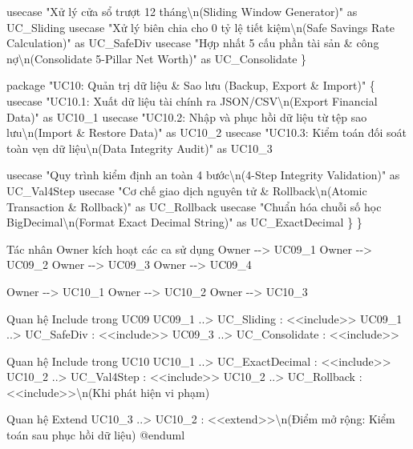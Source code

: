 \documentclass[11pt,a4paper]{article}
\newenvironment{Shaded}{}{}
\newcommand{\NormalTok}[1]{#1}
\begin{document}
\begin{Shaded}
\begin{Highlighting}[]
\NormalTok{        usecase "Xử lý cửa sổ trượt 12 tháng\textbackslash{}n(Sliding Window Generator)" as UC\_Sliding}
\NormalTok{        usecase "Xử lý biên chia cho 0 tỷ lệ tiết kiệm\textbackslash{}n(Safe Savings Rate Calculation)" as UC\_SafeDiv}
\NormalTok{        usecase "Hợp nhất 5 cấu phần tài sản \& công nợ\textbackslash{}n(Consolidate 5{-}Pillar Net Worth)" as UC\_Consolidate}
\NormalTok{    \}}

\NormalTok{    package "UC10: Quản trị dữ liệu \& Sao lưu (Backup, Export \& Import)" \{}
\NormalTok{        usecase "UC10.1: Xuất dữ liệu tài chính ra JSON/CSV\textbackslash{}n(Export Financial Data)" as UC10\_1}
\NormalTok{        usecase "UC10.2: Nhập và phục hồi dữ liệu từ tệp sao lưu\textbackslash{}n(Import \& Restore Data)" as UC10\_2}
\NormalTok{        usecase "UC10.3: Kiểm toán đối soát toàn vẹn dữ liệu\textbackslash{}n(Data Integrity Audit)" as UC10\_3}
        
\NormalTok{        usecase "Quy trình kiểm định an toàn 4 bước\textbackslash{}n(4{-}Step Integrity Validation)" as UC\_Val4Step}
\NormalTok{        usecase "Cơ chế giao dịch nguyên tử \& Rollback\textbackslash{}n(Atomic Transaction \& Rollback)" as UC\_Rollback}
\NormalTok{        usecase "Chuẩn hóa chuỗi số học BigDecimal\textbackslash{}n(Format Exact Decimal String)" as UC\_ExactDecimal}
\NormalTok{    \}}
\NormalTok{\}}

\NormalTok{\textquotesingle{} Tác nhân Owner kích hoạt các ca sử dụng}
\NormalTok{Owner {-}{-}\textgreater{} UC09\_1}
\NormalTok{Owner {-}{-}\textgreater{} UC09\_2}
\NormalTok{Owner {-}{-}\textgreater{} UC09\_3}
\NormalTok{Owner {-}{-}\textgreater{} UC09\_4}

\NormalTok{Owner {-}{-}\textgreater{} UC10\_1}
\NormalTok{Owner {-}{-}\textgreater{} UC10\_2}
\NormalTok{Owner {-}{-}\textgreater{} UC10\_3}

\NormalTok{\textquotesingle{} Quan hệ Include trong UC09}
\NormalTok{UC09\_1 ..\textgreater{} UC\_Sliding : \textless{}\textless{}include\textgreater{}\textgreater{}}
\NormalTok{UC09\_1 ..\textgreater{} UC\_SafeDiv : \textless{}\textless{}include\textgreater{}\textgreater{}}
\NormalTok{UC09\_3 ..\textgreater{} UC\_Consolidate : \textless{}\textless{}include\textgreater{}\textgreater{}}

\NormalTok{\textquotesingle{} Quan hệ Include trong UC10}
\NormalTok{UC10\_1 ..\textgreater{} UC\_ExactDecimal : \textless{}\textless{}include\textgreater{}\textgreater{}}
\NormalTok{UC10\_2 ..\textgreater{} UC\_Val4Step : \textless{}\textless{}include\textgreater{}\textgreater{}}
\NormalTok{UC10\_2 ..\textgreater{} UC\_Rollback : \textless{}\textless{}include\textgreater{}\textgreater{}\textbackslash{}n(Khi phát hiện vi phạm)}

\NormalTok{\textquotesingle{} Quan hệ Extend}
\NormalTok{UC10\_3 ..\textgreater{} UC10\_2 : \textless{}\textless{}extend\textgreater{}\textgreater{}\textbackslash{}n(Điểm mở rộng: Kiểm toán sau phục hồi dữ liệu)}
\NormalTok{@enduml}
\end{Highlighting}
\end{Shaded}
\fi
\end{document}
